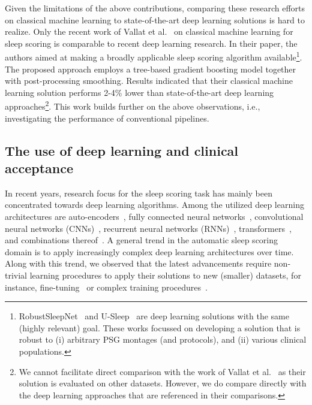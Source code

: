 \documentclass[runningheads]{llncs}
\begin{document}
Given the limitations of the above contributions, comparing these research efforts on classical machine learning to state-of-the-art deep learning solutions is hard to realize. Only the recent work of Vallat et al.~\cite{vallat2021open} on classical machine learning for sleep scoring is comparable to recent deep learning research. In their paper, the authors aimed at making a broadly applicable sleep scoring algorithm available\footnote{RobustSleepNet~\cite{guillot2021robustsleepnet} and U-Sleep~\cite{perslev2021usleep} are deep learning solutions with the same (highly relevant) goal. These works focussed on developing a solution that is robust to (i) arbitrary PSG montages (and protocols), and (ii) various clinical populations.}. The proposed approach employs a tree-based gradient boosting model together with post-processing smoothing. Results indicated that their classical machine learning solution performs 2-4\% lower than state-of-the-art deep learning approaches\footnote{We cannot facilitate direct comparison with the work of Vallat et al.~\cite{vallat2021open} as their solution is evaluated on other datasets. However, we do compare directly with the deep learning approaches that are referenced in their comparisons.}. This work builds further on the above observations, i.e., investigating the performance of conventional pipelines.

\subsection{The use of deep learning and clinical acceptance}\label{sec:related_work_DL}
In recent years, research focus for the sleep scoring task has mainly been concentrated towards deep learning algorithms. Among the utilized deep learning architectures are auto-encoders~\cite{tsinalis2016automatic1}, fully connected neural networks~\cite{dong2017mixed}, convolutional neural networks (CNNs)~\cite{tsinalis2016automatic2,vilamala2017deep,chambon2018deep,olesen2018deep,sors2018convolutional,eldele2021attention}, recurrent neural networks (RNNs)~\cite{michielli2019cascaded,you2022automatic}, transformers~\cite{phan2022sleeptransformer}, and combinations thereof~\cite{supratak2017deepsleepnet,phan2018joint,seo2020iitnet,mousavi2019sleepeegnet,guillot2021robustsleepnet,phan2020towards,phan2021xsleepnet}.
A general trend in the automatic sleep scoring domain is to apply increasingly complex deep learning architectures over time. 
Along with this trend, we observed that the latest advancements require non-trivial learning procedures to apply their solutions to new (smaller) datasets, for instance, fine-tuning~\cite{phan2020towards,guillot2021robustsleepnet,phan2022sleeptransformer,phan2022sleeptransformer} or complex training procedures~\cite{phan2021xsleepnet,supratak2020tinysleepnet}.
\end{document}
